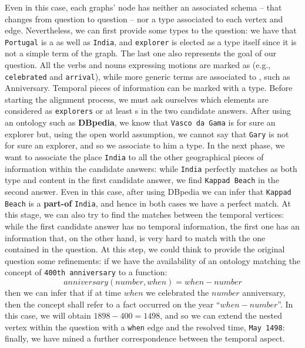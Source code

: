 \begin{example}
Even in this case, each graphs' node has neither an associated schema -- that changes from question to question -- nor a type associated to each vertex and edge. Nevertheless, we can first provide some types to the question: we have that \texttt{Portugal} is a   as well as \texttt{India}, and \texttt{explorer} is elected as a type itself since it is not a simple term of the graph. The last one also represents the goal of our question. All the verbs and nouns expressing motions are marked as  (e.g., \texttt{celebrated} and \texttt{arrival}), while more generic terms are associated to , such as Anniversary. Temporal pieces of information can be marked with a  type. Before starting the alignment process, we must ask ourselves which elements are considered as \texttt{explorers} or at least s in the two candidate answers. After using an ontology such as \textbf{DBpedia}, we know that \texttt{Vasco da Gama} is for sure an explorer but, using the open world assumption, we cannot say that \texttt{Gary} is not for sure an explorer, and so we associate to him a  type. In the next phase, we want to associate the place  \texttt{India} to all the other geographical pieces of information within the candidate answers: while \texttt{India} perfectly matches as both type and content in the first candidate answer, we find \texttt{Kappad Beach} in the second answer. Even in this case, after using DBpedia we can infer that \texttt{Kappad Beach} is  a \textbf{part-of} \texttt{India}, and hence in both cases we have a perfect match. At this stage, we can also try to find the matches between the temporal vertices: while the first candidate answer has no temporal information, the first one has an information that, on the other hand, is very hard to match with the one contained in the question. At this step, we could think to provide the original question some refinements: if we have the availability of an ontology matching the concept of \texttt{400th anniversary} to a function: \[anniversary(number,when)=when-number\] then we can infer that if at time $when$ we celebrated the $number$ anniversary, then the concept shall refer to a fact occurred on the year ``$when-number$''. In this case, we will obtain $1898-400=1498$, and so we can extend the nested vertex within the question with a \texttt{when} edge and the resolved time, \texttt{May 1498}: finally, we have mined a further correspondence between the temporal aspect.
	


\end{example}
